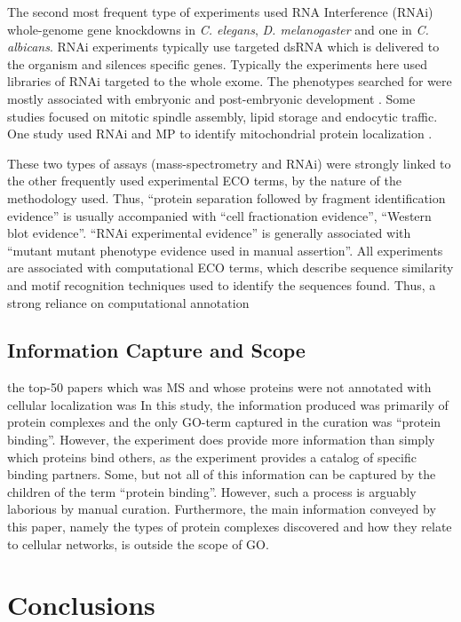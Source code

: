 \documentclass[12pt]{article}
\begin{document}
The second most frequent type of experiments used RNA Interference (RNAi) whole-genome gene
knockdowns in \textit{C. elegans}, \textit{D. melanogaster} and one in \textit{C. albicans}.  RNAi
experiments typically use targeted dsRNA which is delivered to the organism and silences specific
genes. Typically the experiments here used libraries of RNAi targeted to the whole exome. The
phenotypes searched for were mostly associated with embryonic and post-embryonic development
\cite{relevant papers}. Some studies focused on mitotic spindle assembly\cite{17412918}, lipid
storage\cite{17412918} and endocytic traffic\cite{17412918}. One study used RNAi and MP to identify
mitochondrial protein localization \cite{18433294}.

These two types of assays (mass-spectrometry and RNAi)  were strongly linked to the other frequently
used experimental ECO terms, by the nature of the methodology used. Thus, ``protein separation
followed by fragment identification evidence'' is usually accompanied with ``cell fractionation
evidence'', ``Western blot evidence''.  ``RNAi experimental evidence'' is generally associated with
``mutant mutant phenotype evidence used in manual assertion''. All experiments are associated with
computational ECO terms, which describe sequence similarity and motif recognition techniques used to
identify the sequences found. Thus, a strong reliance on computational annotation 


\subsection*{Information Capture and Scope}

the top-50 papers which was MS and whose proteins were not annotated with cellular localization was
In this study, the information produced was primarily of protein  complexes and the only
GO-term captured in the curation was ``protein binding''.  However, the experiment does provide more
information than simply which proteins bind others, as the experiment provides a catalog of specific
binding partners. Some, but not all of this information can be captured by the children of the term
``protein binding''. However, such a process is arguably laborious by manual curation. Furthermore,
the main information conveyed by this paper, namely the types of protein complexes discovered and
how they relate to cellular networks, is outside the scope of GO.


\section*{Conclusions}
\end{document}

